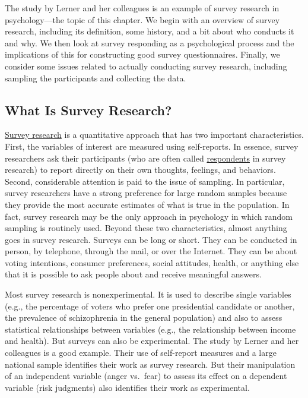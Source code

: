 \documentclass[
]{krantz}
\begin{document}
The study by Lerner and her colleagues is an example of survey research in psychology---the topic of this chapter. We begin with an overview of survey research, including its definition, some history, and a bit about who conducts it and why. We then look at survey responding as a psychological process and the implications of this for constructing good survey questionnaires. Finally, we consider some issues related to actually conducting survey research, including sampling the participants and collecting the data.

\hypertarget{what-is-survey-research}{%
\subsection*{What Is Survey Research?}\label{what-is-survey-research}}


\protect\hyperlink{survey-research-1}{Survey research} is a quantitative approach that has two important characteristics. First, the variables of interest are measured using self-reports. In essence, survey researchers ask their participants (who are often called \protect\hyperlink{respondent}{respondents} in survey research) to report directly on their own thoughts, feelings, and behaviors. Second, considerable attention is paid to the issue of sampling. In particular, survey researchers have a strong preference for large random samples because they provide the most accurate estimates of what is true in the population. In fact, survey research may be the only approach in psychology in which random sampling is routinely used. Beyond these two characteristics, almost anything goes in survey research. Surveys can be long or short. They can be conducted in person, by telephone, through the mail, or over the Internet. They can be about voting intentions, consumer preferences, social attitudes, health, or anything else that it is possible to ask people about and receive meaningful answers.

Most survey research is nonexperimental. It is used to describe single variables (e.g., the percentage of voters who prefer one presidential candidate or another, the prevalence of schizophrenia in the general population) and also to assess statistical relationships between variables (e.g., the relationship between income and health). But surveys can also be experimental. The study by Lerner and her colleagues is a good example. Their use of self-report measures and a large national sample identifies their work as survey research. But their manipulation of an independent variable (anger vs.~fear) to assess its effect on a dependent variable (risk judgments) also identifies their work as experimental.
\end{document}
